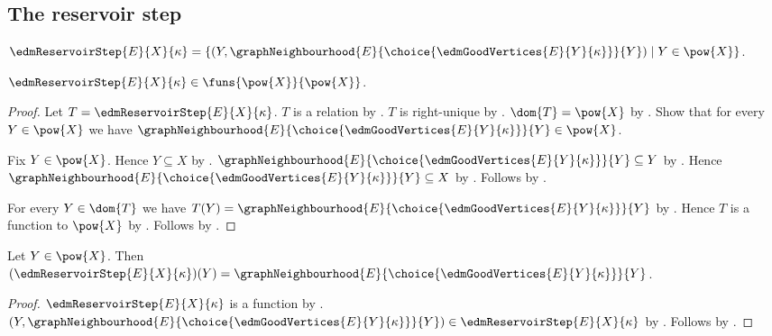 \subsection{The reservoir step}

\begin{definition}\label{edm_reservoir_step}
    $\edmReservoirStep{E}{X}{\kappa}
        =\{(Y,
            \graphNeighbourhood{E}
                {\choice{\edmGoodVertices{E}{Y}{\kappa}}}{Y})
            \mid Y\in\pow{X}\}$.
\end{definition}

\begin{theorem}\label{edm_reservoir_step_type}
    $\edmReservoirStep{E}{X}{\kappa}
        \in\funs{\pow{X}}{\pow{X}}$.
\end{theorem}
\begin{proof}
    Let $T=\edmReservoirStep{E}{X}{\kappa}$.
    $T$ is a relation by .
    $T$ is right-unique by
        .
    $\dom{T}=\pow{X}$ by
        .
    Show that for every $Y\in\pow{X}$ we have
        $\graphNeighbourhood{E}
            {\choice{\edmGoodVertices{E}{Y}{\kappa}}}{Y}
            \in\pow{X}$.
    \begin{subproof}
        Fix $Y\in\pow{X}$.
        Hence $Y\subseteq X$ by .
        $\graphNeighbourhood{E}
            {\choice{\edmGoodVertices{E}{Y}{\kappa}}}{Y}
            \subseteq Y$ by .
        Hence $\graphNeighbourhood{E}
            {\choice{\edmGoodVertices{E}{Y}{\kappa}}}{Y}
            \subseteq X$ by .
        Follows by .
    \end{subproof}
    For every $Y\in\dom{T}$ we have
        $T(Y)=\graphNeighbourhood{E}
            {\choice{\edmGoodVertices{E}{Y}{\kappa}}}{Y}$ by
        .
    Hence $T$ is a function to $\pow{X}$ by \auto.
    Follows by .
\end{proof}

\begin{proposition}\label{edm_reservoir_step_apply}
    Let $Y\in\pow{X}$.
    Then $(\edmReservoirStep{E}{X}{\kappa})(Y)
        =\graphNeighbourhood{E}
            {\choice{\edmGoodVertices{E}{Y}{\kappa}}}{Y}$.
\end{proposition}
\begin{proof}
    $\edmReservoirStep{E}{X}{\kappa}$ is a function by
        .
    $(Y,\graphNeighbourhood{E}
            {\choice{\edmGoodVertices{E}{Y}{\kappa}}}{Y})
        \in\edmReservoirStep{E}{X}{\kappa}$ by
        .
    Follows by .
\end{proof}

